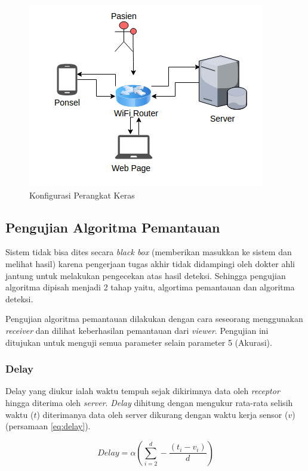 \begin{figure}
	\centering
	\includegraphics[scale=0.82]{images/konfigurasi.png}
	\caption{Konfigurasi Perangkat Keras}
	\label{fig:konfigurasi}
\end{figure}

\subsection{Pengujian Algoritma Pemantauan}
Sistem tidak bisa dites secara \textit{black box} (memberikan masukkan ke sistem dan melihat hasil) karena pengerjaan tugas akhir tidak didampingi oleh dokter ahli jantung untuk melakukan pengecekan atas hasil deteksi. Sehingga pengujian algoritma dipisah menjadi  2 tahap yaitu, algortima pemantauan dan algoritma deteksi. 

Pengujian algoritma pemantauan dilakukan dengan cara seseorang menggunakan \textit{receiver} dan dilihat keberhasilan pemantauan dari \textit{viewer}. Pengujian ini ditujukan untuk menguji semua parameter selain parameter 5 (Akurasi).

\subsubsection{Delay}
Delay yang diukur ialah waktu tempuh sejak dikirimnya data oleh \textit{receptor} hingga diterima oleh \textit{server}. \textit{Delay} dihitung dengan mengukur rata-rata selisih waktu ($t$) diterimanya data oleh server dikurang dengan waktu kerja sensor ($v$) (persamaan \ref{eq:delay}).

\begin{equation}
Delay = \alpha (\sum_{i=2}^{d} -\frac{(t_{i} - v_{i})}{d})
\label{eq:delay} 
\end{equation}

